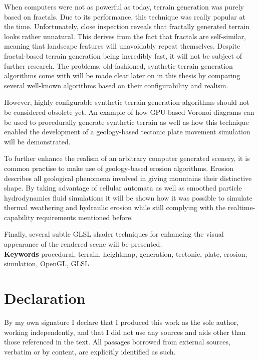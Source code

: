 \documentclass[11pt,a4paper,twoside,openright]{report}
\begin{document}
When computers were not as powerful as today, terrain generation was purely based on fractals. Due to its performance, this technique was really popular at the time. Unfortunately, close inspection reveals that fractally generated terrain looks rather unnatural. This derives from the fact that fractals are self-similar, meaning that landscape features will unavoidably repeat themselves. Despite fractal-based terrain generation being incredibly fast, it will not be subject of further research. The problems, old-fashioned, synthetic terrain generation algorithms come with will be made clear later on in this thesis by comparing several well-known algorithms based on their configurability and realism.

However, highly configurable synthetic terrain generation algorithms should not be considered obsolete yet. An example of how GPU-based Voronoi diagrams can be used to procedurally generate synthetic terrain as well as how this technique enabled the development of a geology-based tectonic plate movement simulation will be demonstrated.

To further enhance the realism of an arbitrary computer generated scenery, it is common practise to make use of geology-based erosion algorithms. Erosion describes all geological phenomena involved in giving mountains their distinctive shape. By taking advantage of cellular automata as well as smoothed particle hydrodynamics fluid simulations it will be shown how it was possible to simulate thermal weathering and hydraulic erosion while still complying with the realtime-capability requirements mentioned before.

Finally, several subtle GLSL shader techniques for enhancing the visual appearance of the rendered scene will be presented.
\medskip
\noindent \\\textbf{Keywords} procedural, terrain, heightmap, generation, tectonic, plate, erosion, simulation, OpenGL, GLSL



\tableofcontents
\listoffigures
\listoftables


\chapter*{Declaration}
By my own signature I declare that I produced this work as the sole author, working independently,
and that I did not use any sources and aids other than those referenced in the text.
All passages borrowed from external sources, verbatim or by content, are explicitly identified as
such.\\
\end{document}
